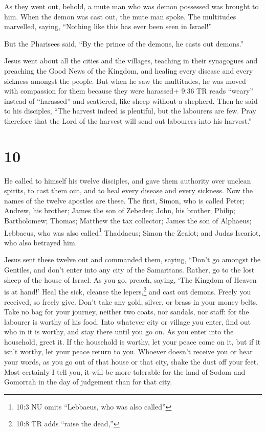  As they went out, behold, a mute man who was demon
possessed was brought to him.  When the demon was cast out,
the mute man spoke. The multitudes marvelled, saying, ``Nothing like
this has ever been seen in Israel!''

 But the Pharisees said, ``By the prince of the demons, he
casts out demons.''

 Jesus went about all the cities and the villages, teaching
in their synagogues and preaching the Good News of the Kingdom, and
healing every disease and every sickness amongst the people.
 But when he saw the multitudes, he was moved with
compassion for them because they were harassed+ 9:36 TR reads ``weary''
instead of ``harassed'' and scattered, like sheep without a shepherd.
 Then he said to his disciples, ``The harvest indeed is
plentiful, but the labourers are few.  Pray therefore that
the Lord of the harvest will send out labourers into his harvest.''

\hypertarget{section-9}{%
\section{10}\label{section-9}}

 He called to himself his twelve disciples, and gave them
authority over unclean spirits, to cast them out, and to heal every
disease and every sickness.  Now the names of the twelve
apostles are these. The first, Simon, who is called Peter; Andrew, his
brother; James the son of Zebedee; John, his brother; 
Philip; Bartholomew; Thomas; Matthew the tax collector; James the son of
Alphaeus; Lebbaeus, who was also called\footnote{10:3 NU omits
  ``Lebbaeus, who was also called''} Thaddaeus;  Simon the
Zealot; and Judas Iscariot, who also betrayed him.

 Jesus sent these twelve out and commanded them, saying,
``Don't go amongst the Gentiles, and don't enter into any city of the
Samaritans.  Rather, go to the lost sheep of the house of
Israel.  As you go, preach, saying, `The Kingdom of Heaven
is at hand!'  Heal the sick, cleanse the lepers,\footnote{10:8
  TR adds ``raise the dead,''} and cast out demons. Freely you received,
so freely give.  Don't take any gold, silver, or brass in
your money belts.  Take no bag for your journey, neither
two coats, nor sandals, nor staff: for the labourer is worthy of his
food.  Into whatever city or village you enter, find out
who in it is worthy, and stay there until you go on.  As
you enter into the household, greet it.  If the household
is worthy, let your peace come on it, but if it isn't worthy, let your
peace return to you.  Whoever doesn't receive you or hear
your words, as you go out of that house or that city, shake the dust off
your feet.  Most certainly I tell you, it will be more
tolerable for the land of Sodom and Gomorrah in the day of judgement
than for that city.

